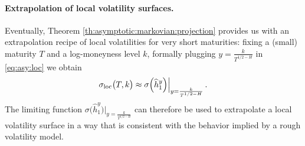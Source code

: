 \documentclass[11pt]{article}
\theoremstyle{plain}
\theoremstyle{definition}
\theoremstyle{remark}
\renewcommand{\hat}{\widehat}
\newcommand{\1}{\mathbf{1}}
\numberwithin{equation}{section}
\def\sigDup{\sigma_\mathrm{loc}}
\begin{document}
\paragraph{Extrapolation of local volatility surfaces.}
Eventually, Theorem \ref{th:asymptotic:markovian:projection} provides us with an extrapolation recipe of local volatilities for very short maturities: fixing a (small) maturity $T$ and a log-moneyness level $k$, formally plugging $y =  \frac k {T^{1/2-H}}$ in \eqref{eq:asy:loc}  we obtain
\[
\sigDup \bigl(T, k \bigr) \approx  
\sigma \Bigl( \hat h_1^{y} \Bigr)\Bigr|_{y =  \frac k {T^{1/2-H}}} \,.
\]
The limiting function $\sigma \bigl( \hat h_1^{y} \bigr)|_{y =  \frac k {T^{1/2-H}} }$ can therefore be used to extrapolate a local volatility surface in a way that is consistent with the behavior implied by a rough volatility model.
\end{document}
